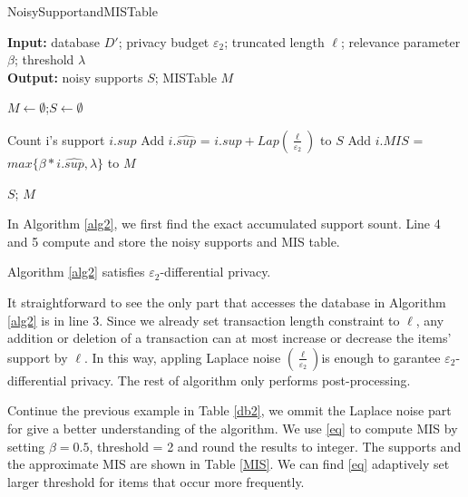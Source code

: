 \documentclass[conference]{IEEEtran}
\begin{document}
\begin{algorithm}[htbp]
    \caption{NoisySupportandMISTable}
    \hspace*{0.02in} {\bf Input:} %
    database $D'$; privacy budget $\varepsilon_2$; truncated length $\ell$; relevance parameter $\beta$; threshold $\lambda$\\
    \hspace*{0.02in} {\bf Output:} %
    noisy supports $S$; MISTable $M$

    \begin{algorithmic}[1]
        \State $M\leftarrow \emptyset$;$S\leftarrow \emptyset$

        \State Count i's support $i.sup$
        \State Add $i.\hat{sup}$ = $i.sup + Lap(\frac{\ell}{\varepsilon_2})$ to $S$
        \State Add $i.MIS$ = $max\{ \beta * i.\hat{sup}, \lambda\} $ to $M$
        \EndFor
        
    \State \Return $S$; $M$
    \end{algorithmic} 
    \label{alg2}
\end{algorithm}

In Algorithm \ref{alg2}, we first find the exact accumulated support sount. 
Line 4 and 5 compute and store the noisy supports and MIS table.
\begin{theorem}
    Algorithm \ref{alg2} satisfies $\varepsilon_2$-differential privacy.
    \label{th2}
\end{theorem}
\begin{IEEEproof}
It straightforward to see the only part that accesses the database in Algorithm \ref{alg2} is in line 3.
Since we already set transaction length constraint to $\ell$, any addition or deletion of a transaction can at most increase or decrease the items' support by $\ell$.
In this way, appling Laplace noise $(\frac{\ell}{\varepsilon_2})$is enough to garantee $\varepsilon_2$-differential privacy.
The rest of algorithm only performs post-processing.
\end{IEEEproof}

\begin{example}  
    Continue the previous example in Table \ref{db2}, we ommit the Laplace noise part for give a better understanding of the algorithm.
    We use \eqref{eq} to compute MIS by setting $\beta=0.5$, threshold = 2 and round the results to integer.
    The supports and the approximate MIS are shown in Table \ref{MIS}.
    We can find \eqref{eq} adaptively set larger threshold for items that occur more frequently.
\end{example}
\end{document}
